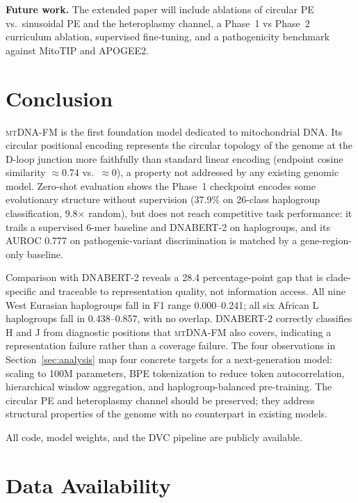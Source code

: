 \documentclass[10pt]{article}
\newcommand{\mtdnafm}{\textsc{mtDNA-FM}\xspace}
\begin{document}
\textbf{Future work.} The extended paper will include ablations of circular PE vs.\ sinusoidal
PE and the heteroplasmy channel, a Phase~1 vs Phase~2 curriculum ablation, supervised
fine-tuning, and a pathogenicity benchmark against MitoTIP and APOGEE2.

\section{Conclusion}

\mtdnafm{} is the first foundation model dedicated to mitochondrial DNA. Its circular positional
encoding represents the circular topology of the genome at the D-loop junction more faithfully
than standard linear encoding (endpoint cosine similarity $\approx$0.74 vs.\ $\approx$0), a
property not addressed by any existing genomic model. Zero-shot evaluation shows the Phase~1
checkpoint encodes some evolutionary structure without supervision (37.9\% on 26-class haplogroup
classification, 9.8$\times$ random), but does not reach competitive task performance: it trails a
supervised 6-mer baseline and DNABERT-2 on haplogroups, and its AUROC 0.777 on pathogenic-variant
discrimination is matched by a gene-region-only baseline.

Comparison with DNABERT-2 reveals a 28.4 percentage-point gap that is clade-specific and
traceable to representation quality, not information access. All nine West Eurasian haplogroups
fall in F1 range 0.000--0.241; all six African L haplogroups fall in 0.438--0.857, with no
overlap. DNABERT-2 correctly classifies H and J from diagnostic positions that \mtdnafm{} also
covers, indicating a representation failure rather than a coverage failure. The four observations
in Section~\ref{sec:analysis} map four concrete targets for a next-generation model: scaling
to 100M parameters, BPE tokenization to reduce token autocorrelation, hierarchical window
aggregation, and haplogroup-balanced pre-training. The circular PE and heteroplasmy channel
should be preserved; they address structural properties of the genome with no counterpart in
existing models.

All code, model weights, and the DVC pipeline are publicly available.

\section*{Data Availability}
\end{document}
